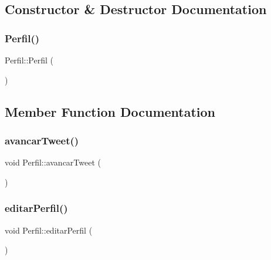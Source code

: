 \subsection{Constructor \& Destructor Documentation}
\mbox{\label{class_perfil_a7d33c31b4d676edb7d5e5ff2905ce0c0}} 
\subsubsection{\texorpdfstring{Perfil()}{Perfil()}}
{\footnotesize\ttfamily Perfil\+::\+Perfil (\begin{DoxyParamCaption}{ }\end{DoxyParamCaption})}



\subsection{Member Function Documentation}
\mbox{\label{class_perfil_a2f8d3a23b664c3457ddd70b3f3857f2b}} 
\subsubsection{\texorpdfstring{avancar\+Tweet()}{avancarTweet()}}
{\footnotesize\ttfamily void Perfil\+::avancar\+Tweet (\begin{DoxyParamCaption}{ }\end{DoxyParamCaption})\hspace{0.3cm}{\ttfamily [private]}}

\mbox{\label{class_perfil_ad20877ec0e6a0d44bd3ec97c216335b0}} 
\subsubsection{\texorpdfstring{editar\+Perfil()}{editarPerfil()}}
{\footnotesize\ttfamily void Perfil\+::editar\+Perfil (\begin{DoxyParamCaption}{ }\end{DoxyParamCaption})\hspace{0.3cm}{\ttfamily [private]}}


